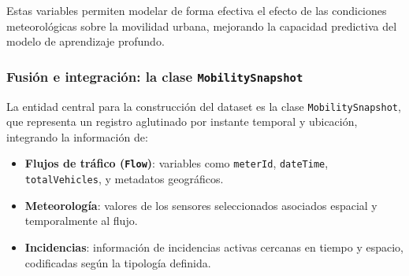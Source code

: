 Estas variables permiten modelar de forma efectiva el efecto de las condiciones meteorológicas sobre la movilidad urbana, mejorando la capacidad predictiva del modelo de aprendizaje profundo.

\subsubsection{Fusión e integración: la clase \texttt{MobilitySnapshot}}

La entidad central para la construcción del dataset es la clase \texttt{MobilitySnapshot}, que representa un registro aglutinado por instante temporal y ubicación, integrando la información de:

\begin{itemize}
	\item \textbf{Flujos de tráfico (\texttt{Flow})}: variables como \texttt{meterId}, \texttt{dateTime}, \texttt{totalVehicles}, y metadatos geográficos.
	\item \textbf{Meteorología}: valores de los sensores seleccionados asociados espacial y temporalmente al flujo.
	\item \textbf{Incidencias}: información de incidencias activas cercanas en tiempo y espacio, codificadas según la tipología definida.
\end{itemize}

